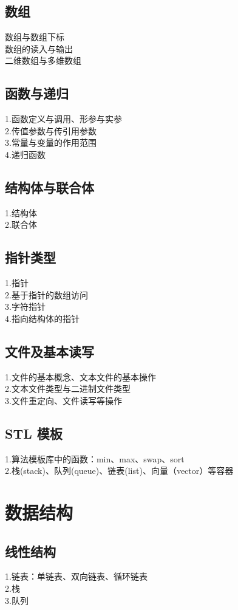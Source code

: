 \documentclass[12pt,twiside,a4paper]{ctexbook}
\numberwithin{chapter}{part}
\begin{document}
\subsection{数组}
数组与数组下标\\
数组的读入与输出\\
二维数组与多维数组

\subsection{函数与递归}
1.函数定义与调用、形参与实参\\
2.传值参数与传引用参数\\
3.常量与变量的作用范围\\
4.递归函数

\subsection{结构体与联合体}
1.结构体\\
2.联合体

\subsection{指针类型}
1.指针\\
2.基于指针的数组访问\\
3.字符指针\\
4.指向结构体的指针

\subsection{文件及基本读写}
1.文件的基本概念、文本文件的基本操作\\
2.文本文件类型与二进制文件类型\\
3.文件重定向、文件读写等操作

\subsection{STL 模板}
1.算法模板库中的函数：min、max、swap、sort\\
2.栈(stack)、队列(queue)、链表(list)、向量（vector）等容器

\section{数据结构}
\subsection{线性结构}
1.链表：单链表、双向链表、循环链表\\
2.栈\\
3.队列
\end{document}
